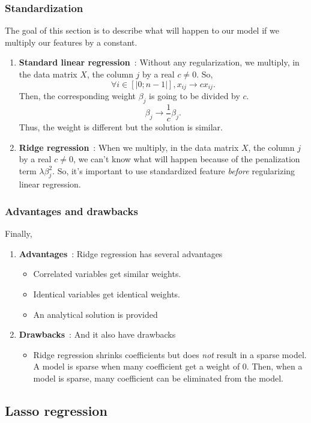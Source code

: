 \documentclass[a4paper,12pt]{article}
\begin{document}
\subsubsection{Standardization}
The goal of this section is to describe what will happen to our model if we multiply our features by a constant.
\begin{enumerate}
\item \textbf{Standard linear regression}~: Without any regularization, we multiply, in the data matrix $X$, the column $j$ by a real $c \not = 0$. So, 
\[\forall i \in [|0;n-1|], x_{ij} \to c x_{ij}.\]
Then, the corresponding weight $\beta_j$ is going to be divided by $c$.
\[ \beta_j \to \frac{1}{c} \beta_j.\]
Thus, the weight is different but the solution is similar.
\item \textbf{Ridge regression}~: When we multiply, in the data matrix $X$, the column $j$ by a real $c \not = 0$, we can't know what will happen because of the penalization term $\lambda \beta_j^2$. So, it's important to use standardized feature \emph{before} regularizing linear regression.
\end{enumerate}
\subsubsection{Advantages and drawbacks}
Finally,
\begin{enumerate}
\item \textbf{Advantages}~: Ridge regression has several advantages
\begin{itemize}
\item Correlated variables get similar weights.
\item Identical variables get identical weights.
\item An analytical solution is provided
\end{itemize}
\item \textbf{Drawbacks}~: And it also have drawbacks
\begin{itemize}
\item Ridge regression shrinks coefficients but does \emph{not} result in a sparse model. A model is sparse when many coefficient get a weight of $0$. Then, when a model is sparse, many coefficient can be eliminated from the model.
\end{itemize} 
\end{enumerate}

\subsection{Lasso regression}
\end{document}
